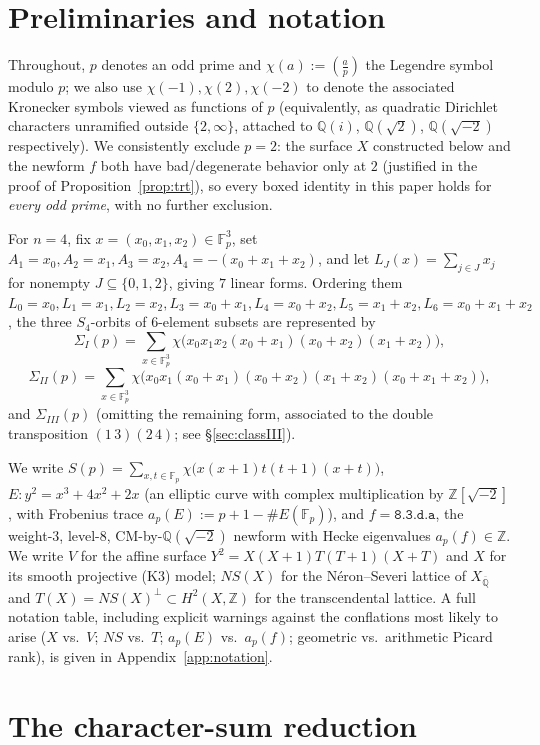 \documentclass[11pt]{amsart}
\theoremstyle{definition}
\newcommand{\Fp}{\mathbb{F}_p}
\newcommand{\Q}{\mathbb{Q}}
\newcommand{\Z}{\mathbb{Z}}
\newcommand{\Qbar}{\overline{\mathbb{Q}}}
\begin{document}
\section{Preliminaries and notation}
\label{sec:prelim}

Throughout, $p$ denotes an odd prime and $\chi(a):=\left(\frac{a}{p}\right)$ the Legendre symbol modulo $p$; we also use $\chi(-1),\chi(2),\chi(-2)$ to denote the associated Kronecker symbols viewed as functions of $p$ (equivalently, as quadratic Dirichlet characters unramified outside $\{2,\infty\}$, attached to $\Q(i)$, $\Q(\sqrt2)$, $\Q(\sqrt{-2})$ respectively). We consistently exclude $p=2$: the surface $X$ constructed below and the newform $f$ both have bad/degenerate behavior only at $2$ (justified in the proof of Proposition~\ref{prop:trt}), so every boxed identity in this paper holds for \emph{every odd prime}, with no further exclusion.

For $n=4$, fix $x=(x_0,x_1,x_2)\in\Fp^3$, set $A_1=x_0,A_2=x_1,A_3=x_2,A_4=-(x_0+x_1+x_2)$, and let $L_J(x)=\sum_{j\in J}x_j$ for nonempty $J\subseteq\{0,1,2\}$, giving $7$ linear forms. Ordering them $L_0=x_0,L_1=x_1,L_2=x_2,L_3=x_0+x_1,L_4=x_0+x_2,L_5=x_1+x_2,L_6=x_0+x_1+x_2$, the three $S_4$-orbits of $6$-element subsets are represented by
\[
\Sigma_I(p)=\sum_{x\in\Fp^3}\chi\bigl(x_0x_1x_2(x_0+x_1)(x_0+x_2)(x_1+x_2)\bigr),
\]
\[
\Sigma_{II}(p)=\sum_{x\in\Fp^3}\chi\bigl(x_0x_1(x_0+x_1)(x_0+x_2)(x_1+x_2)(x_0+x_1+x_2)\bigr),
\]
and $\Sigma_{III}(p)$ (omitting the remaining form, associated to the double transposition $(1\,3)(2\,4)$; see \S\ref{sec:classIII}).

We write $S(p)=\sum_{x,t\in\Fp}\chi\bigl(x(x+1)t(t+1)(x+t)\bigr)$, $E:y^2=x^3+4x^2+2x$ (an elliptic curve with complex multiplication by $\Z[\sqrt{-2}]$, with Frobenius trace $a_p(E):=p+1-\#E(\Fp)$), and $f=\texttt{8.3.d.a}$, the weight-$3$, level-$8$, CM-by-$\Q(\sqrt{-2})$ newform with Hecke eigenvalues $a_p(f)\in\Z$. We write $V$ for the affine surface $Y^2=X(X+1)T(T+1)(X+T)$ and $X$ for its smooth projective (K3) model; $NS(X)$ for the N\'eron--Severi lattice of $X_{\Qbar}$ and $T(X)=NS(X)^\perp\subset H^2(X,\Z)$ for the transcendental lattice. A full notation table, including explicit warnings against the conflations most likely to arise ($X$ vs.\ $V$; $NS$ vs.\ $T$; $a_p(E)$ vs.\ $a_p(f)$; geometric vs.\ arithmetic Picard rank), is given in Appendix~\ref{app:notation}.

\section{The character-sum reduction}
\label{sec:reduction}
\end{document}
